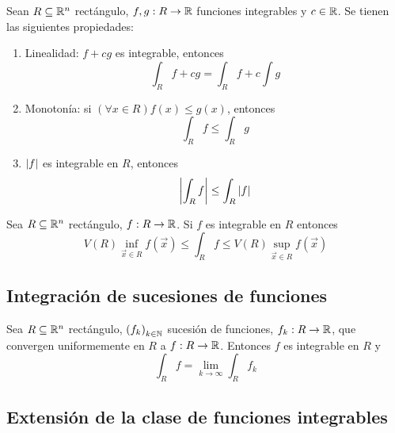 \begin{proposicion}
Sean $ R \subseteq \mathbb{R}^n $ rect\'angulo, $f, g : R \to \mathbb{R}$ funciones integrables  y $ c \in \mathbb{R} $. Se tienen las siguientes propiedades:
\begin{enumerate}
    \item Linealidad: $f+cg$ es integrable, entonces
        \[ \int_R f+cg = \int_R f + c \int g \]
    \item Monoton\'ia: si $(\forall x \in R) f(x) \leq g(x) $, entonces
        \[ \int_R f \leq \int_R g \]
    \item $ \left\lvert f\right\rvert $ es integrable en $ R $, entonces
        \[ \left\lvert \int_R f \right\rvert \leq \int_R \left\lvert f\right\rvert \]
\end{enumerate}
\end{proposicion}

\begin{proposicion} %
Sea $ R \subseteq \mathbb{R}^n $ rect\'angulo, $f : R \to \mathbb{R}$. Si $ f $ es integrable en $ R $ entonces
    \[ V(R) \inf_{\vec{x} \in R} f(\vec{x}) \leq \int_R f \leq V(R) \sup_{\vec{x} \in R} f(\vec{x})\]
\end{proposicion}

\subsection{Integraci\'on de sucesiones de funciones }

\begin{proposicion} \label{pro:convergencia}
Sea $ R \subseteq \mathbb{R}^n $ rect\'angulo, ${(f_k)}_{k \in \mathbb{N}}$ sucesi\'on de funciones, $f_k : R \to \mathbb{R}$, que convergen uniformemente en $ R $ a $ f: R \to \mathbb{R} $. Entonces $ f $ es integrable en $ R $ y
    \[ \int_R f = \lim_{k \to \infty} \int_R f_k \]
\end{proposicion}

\subsection{Extensi\'on de la clase de funciones integrables}

